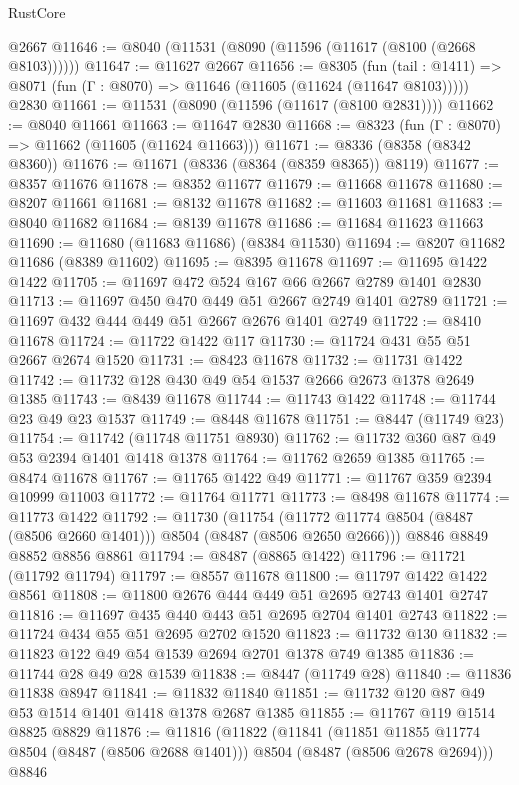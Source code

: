 \begin{lexlean}{RustCore}
\begin{coremodule}
    @2667
@11646 := @8040 (@11531 (@8090 (@11596 (@11617 (@8100 (@2668 @8103))))))
@11647 := @11627 @2667
@11656 := @8305
    (fun (tail : @1411) => @8071 (fun (Γ : @8070) => @11646 (@11605 (@11624 (@11647 @8103)))))
    @2830
@11661 := @11531 (@8090 (@11596 (@11617 (@8100 @2831))))
@11662 := @8040 @11661
@11663 := @11647 @2830
@11668 := @8323 (fun (Γ : @8070) => @11662 (@11605 (@11624 @11663)))
@11671 := @8336 (@8358 (@8342 @8360))
@11676 := @11671 (@8336 (@8364 (@8359 @8365)) @8119)
@11677 := @8357 @11676
@11678 := @8352 @11677
@11679 := @11668 @11678
@11680 := @8207 @11661
@11681 := @8132 @11678
@11682 := @11603 @11681
@11683 := @8040 @11682
@11684 := @8139 @11678
@11686 := @11684 @11623 @11663
@11690 := @11680 (@11683 @11686) (@8384 @11530)
@11694 := @8207 @11682 @11686 (@8389 @11602)
@11695 := @8395 @11678
@11697 := @11695 @1422 @1422
@11705 := @11697 @472 @524 @167 @66 @2667 @2789 @1401 @2830
@11713 := @11697 @450 @470 @449 @51 @2667 @2749 @1401 @2789
@11721 := @11697 @432 @444 @449 @51 @2667 @2676 @1401 @2749
@11722 := @8410 @11678
@11724 := @11722 @1422 @117
@11730 := @11724 @431 @55 @51 @2667 @2674 @1520
@11731 := @8423 @11678
@11732 := @11731 @1422
@11742 := @11732 @128 @430 @49 @54 @1537 @2666 @2673 @1378 @2649 @1385
@11743 := @8439 @11678
@11744 := @11743 @1422
@11748 := @11744 @23 @49 @23 @1537
@11749 := @8448 @11678
@11751 := @8447 (@11749 @23)
@11754 := @11742 (@11748 @11751 @8930)
@11762 := @11732 @360 @87 @49 @53 @2394 @1401 @1418 @1378
@11764 := @11762 @2659 @1385
@11765 := @8474 @11678
@11767 := @11765 @1422 @49
@11771 := @11767 @359 @2394 @10999 @11003
@11772 := @11764 @11771
@11773 := @8498 @11678
@11774 := @11773 @1422
@11792 := @11730
    (@11754 (@11772 @11774 @8504 (@8487 (@8506 @2660 @1401))) @8504 (@8487 (@8506 @2650 @2666)))
    @8846
    @8849
    @8852
    @8856
    @8861
@11794 := @8487 (@8865 @1422)
@11796 := @11721 (@11792 @11794)
@11797 := @8557 @11678
@11800 := @11797 @1422 @1422 @8561
@11808 := @11800 @2676 @444 @449 @51 @2695 @2743 @1401 @2747
@11816 := @11697 @435 @440 @443 @51 @2695 @2704 @1401 @2743
@11822 := @11724 @434 @55 @51 @2695 @2702 @1520
@11823 := @11732 @130
@11832 := @11823 @122 @49 @54 @1539 @2694 @2701 @1378 @749 @1385
@11836 := @11744 @28 @49 @28 @1539
@11838 := @8447 (@11749 @28)
@11840 := @11836 @11838 @8947
@11841 := @11832 @11840
@11851 := @11732 @120 @87 @49 @53 @1514 @1401 @1418 @1378 @2687 @1385
@11855 := @11767 @119 @1514 @8825 @8829
@11876 := @11816
    (@11822
      (@11841
        (@11851 @11855 @11774 @8504 (@8487 (@8506 @2688 @1401)))
        @8504
        (@8487 (@8506 @2678 @2694)))
      @8846

\end{coremodule}
\end{lexlean}
